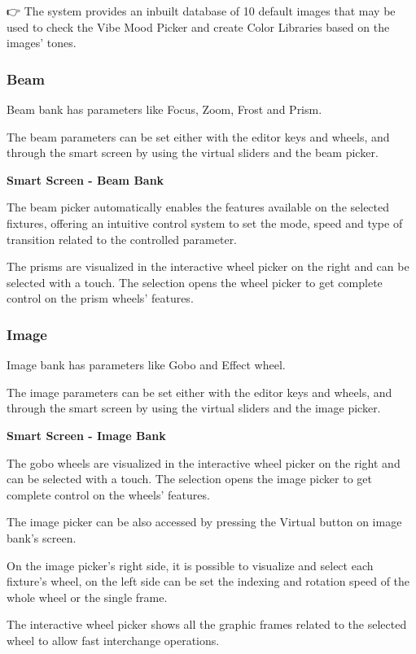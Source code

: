 \documentclass[
]{article}
\begin{document}
👉 The system provides an inbuilt database of 10 default images that may be used to check the Vibe Mood Picker and create Color Libraries based on the images' tones.

\hypertarget{beam}{%
\subsubsection{Beam}\label{beam}}

Beam bank has parameters like Focus, Zoom, Frost and Prism.

The beam parameters can be set either with the editor keys and wheels, and through the smart screen by using the virtual sliders and the beam picker.

\textbf{Smart Screen - Beam Bank}

The beam picker automatically enables the features available on the selected fixtures, offering an intuitive control system to set the mode, speed and type of transition related to the controlled parameter.

The prisms are visualized in the interactive wheel picker on the right and can be selected with a touch. The selection opens the wheel picker to get complete control on the prism wheels' features.

\hypertarget{image}{%
\subsubsection{Image}\label{image}}

Image bank has parameters like Gobo and Effect wheel.

The image parameters can be set either with the editor keys and wheels, and through the smart screen by using the virtual sliders and the image picker.

\textbf{Smart Screen - Image Bank}

The gobo wheels are visualized in the interactive wheel picker on the right and can be selected with a touch. The selection opens the image picker to get complete control on the wheels' features.

The image picker can be also accessed by pressing the Virtual button on image bank's screen.

On the image picker's right side, it is possible to visualize and select each fixture's wheel, on the left side can be set the indexing and rotation speed of the whole wheel or the single frame.

The interactive wheel picker shows all the graphic frames related to the selected wheel to allow fast interchange operations.
\end{document}

